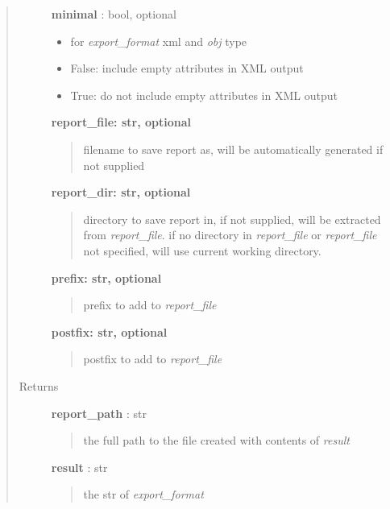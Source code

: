 \documentclass[letterpaper,10pt,english]{sphinxmanual}
\begin{document}
\begin{fulllineitems}
\begin{quote}
\begin{description}
\begin{itemize}
\end{itemize}

\textbf{minimal} : bool, optional
\begin{itemize}
\item {} 
for \emph{export\_format} xml and \emph{obj} type {\hyperref[taniumpy.object_types:taniumpy.object_types.base.BaseType]{}}

\item {} 
False: include empty attributes in XML output

\item {} 
True: do not include empty attributes in XML output

\end{itemize}

\textbf{report\_file: str, optional}
\begin{quote}

filename to save report as, will be automatically generated if not supplied
\end{quote}

\textbf{report\_dir: str, optional}
\begin{quote}

directory to save report in, if not supplied, will be extracted from \emph{report\_file}. if no directory in \emph{report\_file} or \emph{report\_file} not specified, will use current working directory.
\end{quote}

\textbf{prefix: str, optional}
\begin{quote}

prefix to add to \emph{report\_file}
\end{quote}

\textbf{postfix: str, optional}
\begin{quote}

postfix to add to \emph{report\_file}
\end{quote}

\item[{Returns}] \leavevmode
\textbf{report\_path} : str
\begin{quote}

the full path to the file created with contents of \emph{result}
\end{quote}

\textbf{result} : str
\begin{quote}

the str of \emph{export\_format}
\end{quote}

\end{description}\end{quote}

\end{fulllineitems}
\end{document}
